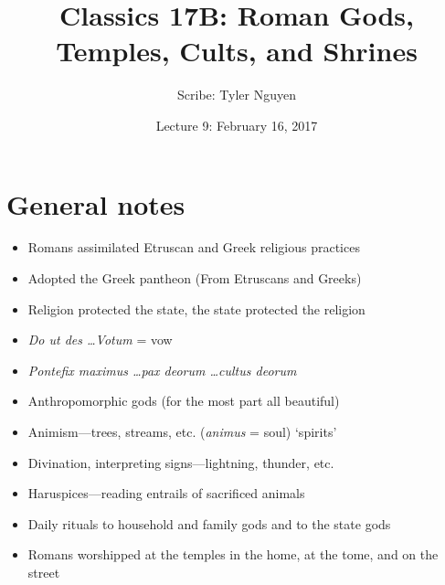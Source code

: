\documentclass{article}
\begin{document}
\title{Classics 17B: Roman Gods, Temples, Cults, and Shrines}
\author{Scribe: Tyler Nguyen}
\date{Lecture 9: February 16, 2017}
\maketitle
\section{General notes}
\begin{itemize}
\item Romans assimilated Etruscan and Greek religious practices
\item Adopted the Greek pantheon (From Etruscans and Greeks)
\item Religion protected the state, the state protected the religion
\item \textit{Do ut des \dots Votum} = vow
\item \textit{Pontefix maximus \dots pax deorum \dots cultus deorum}
\item Anthropomorphic gods (for the most part all beautiful)
\item Animism---trees, streams, etc. (\textit{animus} = soul) `spirits'
\item Divination, interpreting signs---lightning, thunder, etc.
\item Haruspices---reading entrails of sacrificed animals
\item Daily rituals to household and family gods and to the state gods
\item Romans worshipped at the temples in the home, at the tome, and on the street
\end{itemize}
\end{document}
